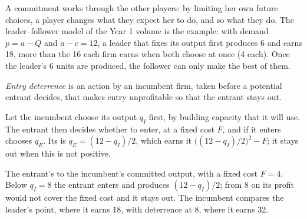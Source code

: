 A commitment works through the other players: by limiting her own future choices, a player changes what
they expect her to do, and so what they do. The leader--follower model of the Year 1 volume is the example:
with demand $p = a - Q$ and $a - c = 12$, a leader that fixes its output first produces 6 and earns 18, more than the 16
each firm earns when both choose at once (4 each). Once the leader's 6 units are produced, the follower can only
make the best of them.

\begin{definition}\label{def:b2:dynamic-games:entry-deterrence}
\emph{Entry deterrence} is an action by an incumbent firm, taken before a potential
entrant decides, that makes entry unprofitable so that the entrant stays out.
\end{definition}

Let the incumbent choose its output $q_I$ first, by building capacity that it will use. The entrant then
decides whether to enter, at a fixed cost $F$, and if it enters chooses $q_E$. Its  is $q_E = (12 -
q_I)/2$, which earns it $\big((12 - q_I)/2\big)^2 - F$; it stays out when this is not positive.

\begin{omfigure}

{\small The entrant's  to the incumbent's committed output, with a fixed cost $F = 4$. Below
$q_I = 8$ the entrant enters and produces $(12 - q_I)/2$; from 8 on its profit would not cover the fixed cost
and it stays out. The incumbent compares the leader's point, where it earns 18, with deterrence at 8, where it
earns 32.}
\end{omfigure}

